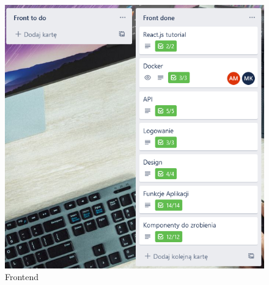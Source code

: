 \documentclass[12pt,a4paper]{article}
\begin{document}
		\begin{figure}[H]
			\centering
			\includegraphics[width=\textwidth]{img/frontend.png}
			\caption{Frontend}
			\label{fig:trello-front}
		\end{figure}
	\newpage
	
\end{document}
